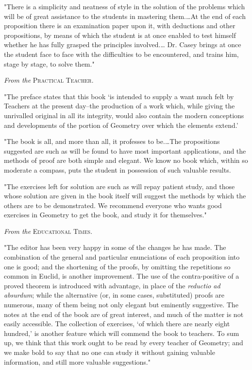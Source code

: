 \documentclass[oneside]{book}
\begin{document}
\begin{footnotesize}
"There is a simplicity and neatness of style in the solution of
the problems which will be of great assistance to the students in
mastering them.\ldots At the end of each proposition there is an
examination paper upon it, with deductions and other propositions,
by means of which the student is at once enabled to test
himself whether he has fully grasped the principles involved.\ldots
Dr. Casey brings at once the student face to face with the difficulties
to be encountered, and trains him, stage by stage, to solve
them."

\medskip
\begin{center}
\textit{From the} \textsc{Practical Teacher}.
\end{center}
\nopagebreak

"The preface states that this book `is intended to supply a
want much felt by Teachers at the present day--the production
of a work which, while giving the unrivalled original in all its
integrity, would also contain the modern conceptions and developments
of the portion of Geometry over which the elements
extend.'

"The book is all, and more than all, it professes to be.\ldots The
propositions suggested are such as will be found to have most
important applications, and the methods of proof are both simple
and elegant. We know no book which, within so moderate
a compass, puts the student in possession of such valuable results.

"The exercises left for solution are such as will repay patient
study, and those whose solution are given in the book itself will
suggest the methods by which the others are to be demonstrated.
We recommend everyone who wants good exercises in Geometry
to get the book, and study it for themselves."

\medskip
\begin{center}
\textit{From the} \textsc{Educational Times}.
\end{center}
\nopagebreak

"The editor has been very happy in some of the changes he
has made. The combination of the general and particular enunciations
of each proposition into one is good; and the shortening
of the proofs, by omitting the repetitions so common in Euclid, is
another improvement. The use of the contra-positive of a proved
theorem is introduced with advantage, in place of the \textit{reductio ad
absurdum}; while the alternative (or, in some cases, substituted)
proofs are numerous, many of them being not only elegant but
eminently suggestive. The notes at the end of the book are of
great interest, and much of the matter is not easily accessible.
The collection of exercises, `of which there are nearly eight
hundred,' is another feature which will commend the book to
teachers. To sum up, we think that this work ought to be read
by every teacher of Geometry; and we make bold to say that no
one can study it without gaining valuable information, and still
more valuable suggestions."



\end{footnotesize}
\end{document}
